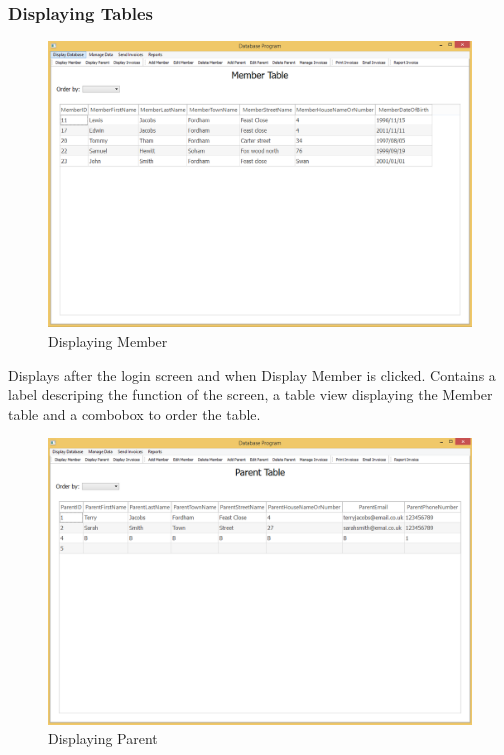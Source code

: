 \subsubsection{Displaying Tables}
\begin{figure}[H]
\includegraphics[width=\textwidth]{./Maintenance/Images/DisplayMember.png}
    \caption{Displaying Member} \label{fig:display_member}
\end{figure}

Displays after the login screen and when Display Member is clicked. Contains a label descriping the function of the screen, a table view displaying the Member table and a combobox to order the table.

\begin{figure}[H]
\includegraphics[width=\textwidth]{./Maintenance/Images/DisplayParent.png}
    \caption{Displaying Parent} \label{fig:display_parent}
\end{figure}

